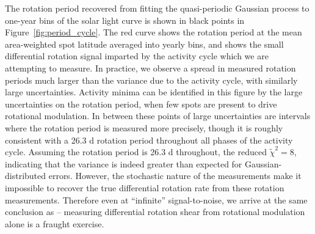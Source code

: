 The rotation period recovered from fitting the quasi-periodic Gaussian process to one-year bins of the solar light curve is shown in black points in Figure~\ref{fig:period_cycle}. The red curve shows the rotation period at the mean area-weighted spot latitude averaged into yearly bins, and shows the small differential rotation signal imparted by the activity cycle which we are attempting to measure. In practice, we observe a spread in measured rotation periods much larger than the variance due to the activity cycle, with similarly large uncertainties. Activity minima can be identified in this figure by the large uncertainties on the rotation period, when few spots are present to drive rotational modulation. In between these points of large uncertainties are intervals where the rotation period is measured more precisely, though it is roughly consistent with a 26.3 d rotation period throughout all phases of the activity cycle. Assuming the rotation period is 26.3 d throughout, the reduced $\tilde{\chi}^2 = 8$, indicating that the variance is indeed greater than expected for Gaussian-distributed errors. However, the stochastic nature of the measurements make it impossible to recover the true differential rotation rate from these rotation measurements. Therefore even at ``infinite'' signal-to-noise, we arrive at the same conclusion as \citet{Aigrain2015} -- measuring differential rotation shear from rotational modulation alone is a fraught exercise. 

